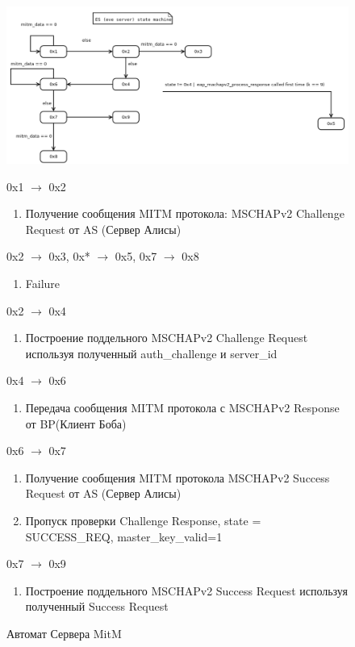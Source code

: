 \documentclass[oneside, final, 14pt]{extarticle}
\begin{document}
\begin{figure}
  \centering \includegraphics[scale=0.5]
    {res/eve-server-mitm-state-machine-diagram.png}

  0x1 $\rightarrow$ 0x2
  \begin{enumerate}
    \item Получение сообщения MITM протокола: MSCHAPv2 Challenge
      Request от AS (Сервер Алисы)
  \end{enumerate}
  0x2 $\rightarrow$ 0x3, 0x* $\rightarrow$ 0x5, 0x7 $\rightarrow$ 0x8
  \begin{enumerate}
    \item Failure
  \end{enumerate}
  0x2 $\rightarrow$ 0x4
  \begin{enumerate}
    \item Построение поддельного MSCHAPv2 Challenge
      Request используя полученный auth\_challenge и server\_id
  \end{enumerate}
  0x4 $\rightarrow$ 0x6
  \begin{enumerate}
    \item Передача сообщения MITM протокола с MSCHAPv2 Response от BP(Клиент Боба)
  \end{enumerate}
  0x6 $\rightarrow$ 0x7
  \begin{enumerate}
    \item Получение сообщения MITM протокола MSCHAPv2 Success
      Request от AS (Сервер Алисы)
    \item Пропуск проверки Challenge Response,
      state = SUCCESS\_REQ, master\_key\_valid=1
  \end{enumerate}
  0x7 $\rightarrow$ 0x9
  \begin{enumerate}
    \item Построение поддельного MSCHAPv2 Success Request используя полученный Success Request
  \end{enumerate}
  \caption{Автомат Сервера MitM}
\end{figure}
\end{document}
